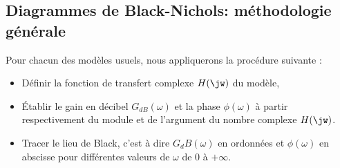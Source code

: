 %    
\clearpage
{}
\captionsetup{width=0.9\linewidth}
\subsection{Diagrammes de Black-Nichols: méthodologie générale}
Pour chacun des modèles usuels, nous appliquerons la procédure suivante :
\begin{itemize}
    \item Définir la fonction de transfert complexe $H(\jw)$ du modèle,
    \item \'Etablir le gain en décibel $G_{dB}(\omega)$ et 
          la phase $\phi(\omega)$ à partir 
          respectivement du module et de l'argument du nombre complexe $H(\jw)$.
    \item Tracer le lieu de Black, c'est à dire $G_dB(\omega)$ en ordonnées 
          et $\phi(\omega)$ en abscisse pour différentes valeurs de $\omega$ 
          de 0 à $+\infty$. 
\end{itemize}
